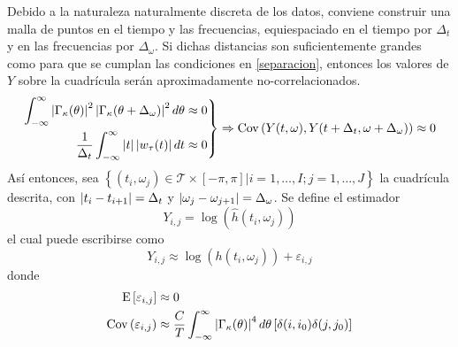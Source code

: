 %

Debido a la naturaleza naturalmente discreta de los datos, conviene construir una malla de puntos en el tiempo y las frecuencias, equiespaciado en el tiempo por $\Delta_t$ y en las frecuencias por $\Delta_\omega$.
Si dichas distancias son suficientemente grandes
como para que se cumplan las condiciones en \ref{separacion}, entonces los valores de $Y$
sobre la cuadrícula serán aproximadamente no-correlacionados.
%
\begin{equation}
\left.
\begin{aligned}
\int_{-\infty}^{\infty} \left| \Gamma_\kappa(\theta) \right|^{2}\left| \Gamma_\kappa(\theta+\Delta_\omega) \right|^{2} d\theta 
&\approx 0 \\
\frac{1}{\Delta_t} \int_{-\infty}^{\infty} \left| t \right| \left| w_\tau (t) \right| dt &\approx 0
\end{aligned}
\right\rbrace
\Rightarrow
\mathrm{Cov}\left( Y(t,\omega),Y(t+\Delta_t,\omega+\Delta_\omega) \right) \approx 0
\label{separacion}
\end{equation}
%
Así entonces, sea
$\left\{ (t_i,\omega_j) \in \mathcal{T} \times [-\pi,\pi] | i = 1,\dots,I ; j=1,\dots,J \right\}$
la cuadrícula descrita, con $\left| t_i - t_{i+1} \right|= \Delta_t$ y 
$\left| \omega_j-\omega_{j+1} \right|= \Delta_\omega$. 
%
Se define el estimador
\begin{equation}
Y_{i,j} = \log\left(\widehat{h}(t_i,\omega_j)\right)
\end{equation}
%
el cual puede escribirse como
\begin{equation}
Y_{i,j} \approx \log\left(h(t_i,\omega_j)\right) + \varepsilon_{i,j}
\label{def:ye}
\end{equation}
donde
\begin{align}
\mathrm{E}\left[ \varepsilon_{i,j} \right] &\approx 0 \\
\mathrm{Cov}\left( \varepsilon_{i,j} \right) &\approx
\frac{C}{T} \int_{-\infty}^{\infty} \left| \Gamma_\kappa(\theta) \right|^{4} d\theta \left[ \delta(i,i_0)\delta(j,j_0) \right]
\end{align}



